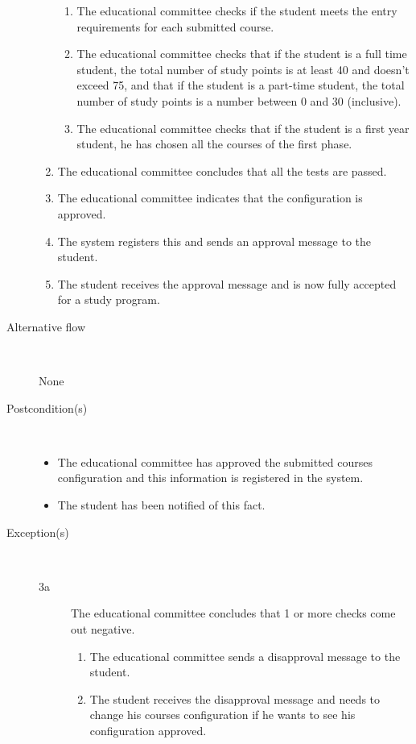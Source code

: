 \begin{description}
\begin{enumerate}
\begin{enumerate}
	  	  \item The educational committee checks if the student meets the entry
	  	  requirements for each submitted course.
	  	  \item The educational committee checks that if the student is a full time
	  	  student, the total number of study points is at least 40 and doesn't
	  	  exceed 75, and that if the student is a part-time student, the total
	  	  number of study points is a number between 0 and 30 (inclusive).
	  	  \item The educational committee checks that if the student is a first year
	  	  student, he has chosen all the courses of the first phase.
	  	\end{enumerate}
	  	\item The educational committee concludes that all the tests are passed.
	  	\item The educational committee indicates that the configuration is
	  	approved.
	  	\item The system registers this and sends an approval message to the
	  	student.
	  	\item The student receives the approval message and is now fully accepted
	  	for a study program.
	\end{enumerate}
	\item[Alternative flow] \
		\par None
	\item[Postcondition(s)] \ 
	\begin{itemize}
		\item The educational committee has approved the submitted courses
		configuration and this information is registered in the system.
		\item The student has been notified of this fact.
	\end{itemize}
	\item[Exception(s)] \ 
	\begin{description}
		\item[3a] The educational committee concludes that 1 or more checks come out
		negative.
		\begin{enumerate}
			\item The educational committee sends a disapproval message to the student.
			\item The student receives the disapproval message and needs to change his
			courses configuration if he wants to see his configuration approved.
		\end{enumerate}
	\end{description}
\end{description}
